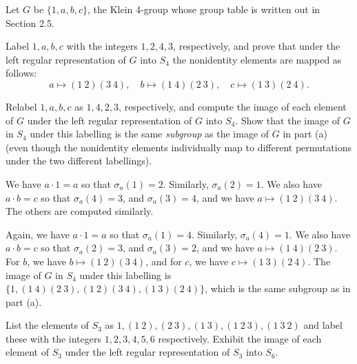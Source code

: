 \begin{exercise}
	\label{ex4.2.1} Let $G$ be $\{1,a,b,c\}$, the Klein 4-group whose group table is written out in Section 2.5.
	\begin{subproblems}
		\item Label $1,a,b,c$ with the integers $1,2,4,3$, respectively, and prove that under the left regular representation of $G$ into $S_4$ the nonidentity elements are mapped as follows:
		\[a \mapsto (1\ 2)(3\ 4), \quad b \mapsto (1\ 4)(2\ 3), \quad c \mapsto (1\ 3)(2\ 4).\]
		\item Relabel $1,a,b,c$ as $1,4,2,3$, respectively, and compute the image of each element of $G$ under the left regular representation of $G$ into $S_4$. Show that the image of $G$ in $S_4$ under this labelling is the same \emph{subgroup} as the image of $G$ in part (a) (even though the nonidentity elements individually map to different permutations under the two different labellings).
	\end{subproblems}
\end{exercise}

\begin{solalph}
	\item We have $a \cdot 1 = a$ so that $\sigma_a(1) = 2$. Similarly, $\sigma_a(2) = 1$. We also have $a \cdot b = c$ so that $\sigma_a(4) = 3$, and $\sigma_a(3) = 4$, and we have $a \mapsto (1\ 2)(3\ 4)$. The others are computed similarly. 
	\item Again, we have $a \cdot 1 = a$ so that $\sigma_a(1) = 4$. Similarly, $\sigma_a(4) = 1$. We also have $a \cdot b = c$ so that $\sigma_a(2) = 3$, and $\sigma_a(3) = 2$, and we have $a \mapsto (1\ 4)(2\ 3)$. For $b$, we have $b \mapsto (1\ 2)(3\ 4)$, and for $c$, we have $c \mapsto (1\ 3)(2\ 4)$. The image of $G$ in $S_4$ under this labelling is $\{1, (1\ 4)(2\ 3), (1\ 2)(3\ 4), (1\ 3)(2\ 4)\}$, which is the same subgroup as in part (a).
\end{solalph}

\begin{exercise}
	List the elements of $S_3$ as $1, (1\ 2), (2\ 3), (1\ 3), (1\ 2\ 3), (1\ 3\ 2)$ and label these with the integers $1,2,3,4,5,6$ respectively. Exhibit the image of each element of $S_3$ under the left regular representation of $S_3$ into $S_6$.
\end{exercise}

